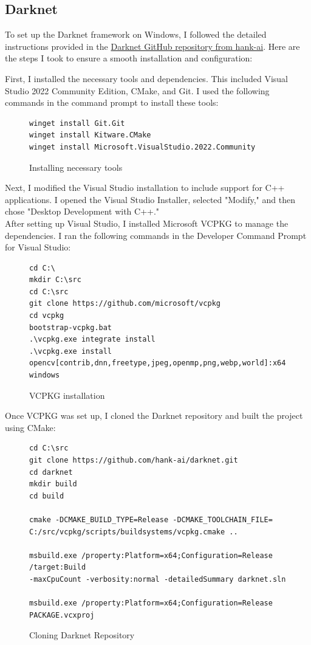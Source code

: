 \subsection{Darknet}

To set up the Darknet framework on Windows, I followed the detailed instructions provided in the \href{https://github.com/hank-ai/darknet}{Darknet GitHub repository from hank-ai}. Here are the steps I took to ensure a smooth installation and configuration:

First, I installed the necessary tools and dependencies. This included Visual Studio 2022 Community Edition, CMake, and Git. I used the following commands in the command prompt to install these tools:
\begin{figure}[H]
    \centering
    \begin{verbatim}
winget install Git.Git
winget install Kitware.CMake
winget install Microsoft.VisualStudio.2022.Community
\end{verbatim}
    \caption{Installing necessary tools}
\end{figure}


Next, I modified the Visual Studio installation to include support for C++ applications. I opened the Visual Studio Installer, selected "Modify," and then chose "Desktop Development with C++."
\\
After setting up Visual Studio, I installed Microsoft VCPKG to manage the dependencies. I ran the following commands in the Developer Command Prompt for Visual Studio:
\begin{figure}[H]
    \centering
    \begin{verbatim}
cd C:\
mkdir C:\src
cd C:\src
git clone https://github.com/microsoft/vcpkg
cd vcpkg
bootstrap-vcpkg.bat
.\vcpkg.exe integrate install
.\vcpkg.exe install 
opencv[contrib,dnn,freetype,jpeg,openmp,png,webp,world]:x64-windows
\end{verbatim}
    \caption{VCPKG installation}
\end{figure}


Once VCPKG was set up, I cloned the Darknet repository and built the project using CMake:

\begin{figure}[H]
    \centering
    \begin{verbatim}
cd C:\src
git clone https://github.com/hank-ai/darknet.git
cd darknet
mkdir build
cd build

cmake -DCMAKE_BUILD_TYPE=Release -DCMAKE_TOOLCHAIN_FILE=
C:/src/vcpkg/scripts/buildsystems/vcpkg.cmake ..

msbuild.exe /property:Platform=x64;Configuration=Release /target:Build 
-maxCpuCount -verbosity:normal -detailedSummary darknet.sln

msbuild.exe /property:Platform=x64;Configuration=Release PACKAGE.vcxproj
\end{verbatim}
    \caption{Cloning Darknet Repository}
\end{figure}



